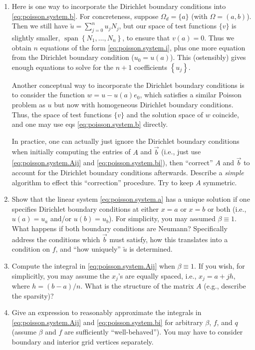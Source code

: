 \begin{enumerate}

\item Here is one way to incorporate the Dirichlet boundary conditions into \eqref{eq:poisson.system.b}. For concreteness, suppose $\Omega_d = \{a\}$ (with $\Omega = (a,b)$). Then we still have $\tilde{u} = \sum_{j = 0}^n u_j N_j$, but our space of test functions $\{v\}$ is slightly smaller, $\operatorname{span} \left\{ N_1, \dotsc, N_n \right\}$, to ensure that $v(a) = 0$. Thus we obtain $n$ equations of the form \eqref{eq:poisson.system.i}, plus one more equation from the Dirichlet boundary condition ($u_0 = u(a)$). This (ostensibly) gives enough equations to solve for the $n + 1$ coefficients $\left\{ u_j \right\}$.

Another conceptual way to incorporate the Dirichlet boundary conditions is to consider the function $w = u - u(a) e_0$, which satisfies a similar Poisson problem as $u$ but now with homogeneous Dirichlet boundary conditions. Thus, the space of test functions $\{v\}$ and the solution space of $w$ coincide, and one may use eqs \eqref{eq:poisson.system.b} directly.

In practice, one can actually just ignore the Dirichlet boundary conditions when initially computing the entries of $A$ and $\vec{b}$ (i.e., just use \eqref{eq:poisson.system.Aij} and \eqref{eq:poisson.system.bi}), then ``correct'' $A$ and $\vec{b}$ to account for the Dirichlet boundary conditions afterwards. Describe a \emph{simple} algorithm to effect this ``correction'' procedure. Try to keep $A$ symmetric.

\item Show that the linear system \eqref{eq:poisson.system.a} has a unique solution if one specifies Dirichlet boundary conditions at either $x = a$ or $x = b$ or both (i.e., $u(a) = u_a$ and/or $u(b) = u_b$). For simplicity, you may assumed $\beta \equiv 1$. What happens if both boundary conditions are Neumann? Specifically address the conditions which $\vec{b}$ must satisfy, how this translates into a condition on $f$, and ``how uniquely'' $\tilde{u}$ is determined.

\item Compute the integral in \eqref{eq:poisson.system.Aij} when $\beta \equiv 1$. If you wish, for simplicitly, you may assume the $x_j$'s are equally spaced, i.e., $x_j = a + j h$, where $h = (b - a)/n$. What is the structure of the matrix $A$ (e.g., describe the sparsity)?

\item Give an expression to reasonably approximate the integrals in \eqref{eq:poisson.system.Aij} and \eqref{eq:poisson.system.bi} for arbitrary $\beta$, $f$, and $q$ (assume $\beta$ and $f$ are sufficiently ``well-behaved''). You may have to consider boundary and interior grid vertices separately.


\end{enumerate}
